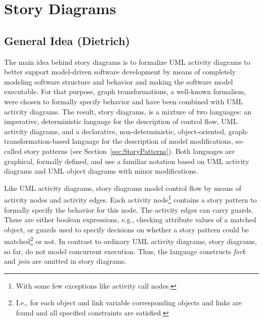 \section{Story Diagrams} \label{sec:StoryDiagrams}

\subsection{General Idea (Dietrich)}


The main idea behind story diagrams is to formalize UML activity diagrams
to better support model-driven software development
by means of completely modeling software structure and behavior and making the software model executable.
For that purpose, graph transformations, a well-known formalism, were chosen to formally specify behavior and have been combined with UML activity diagrams.
The result, story diagrams, is a mixture of two languages:
an imperative, deterministic language for the description of control flow, UML activity diagrams,
and a declarative, non-deterministic, object-oriented, graph-transformation-based language for the description of model modifications, so-called story patterns (see Section~\ref{sec:StoryPatterns}).
Both languages are graphical, formally defined, and use a familiar notation based on UML activity diagrams  and UML object diagrams with minor modifications.

Like UML activity diagrams, story diagrams model control flow by means of activity nodes and activity edges.
Each activity node\footnote{With some few exceptions like activity call nodes.} contains a story pattern to formally specify the behavior for this node.
The activity edges can carry guards.
These are either boolean expressions, e.g., checking attribute values of a matched object,
or guards used to specify decisions on whether a story pattern could be
matched\footnote{I.e., for each object and link variable corresponding objects and links are found and all specified constraints are satisfied.}
or not.
In contrast to ordinary UML activity diagrams, story diagrams, so far, do not model concurrent execution.
Thus, the language constructs \emph{fork} and \emph{join} are omitted in story diagrams.


